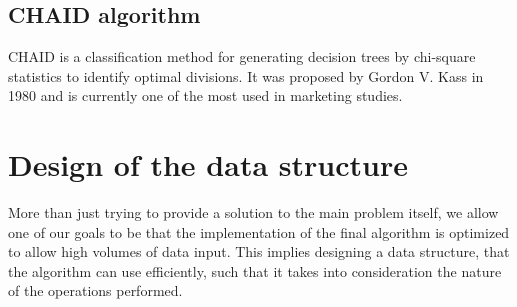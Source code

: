 \documentclass{acm_proc_article-sp}
\begin{document}
\subsection{CHAID algorithm}
CHAID is a classification method for generating decision trees by chi-square statistics to identify optimal divisions. It was proposed by Gordon V. Kass in 1980 and is currently one of the most used in marketing studies.

\section{Design of the data structure}
More than just trying to provide a solution to the main problem itself, we allow one of our goals to be that the implementation of the final algorithm is optimized to allow high volumes of data input. This implies designing a data structure, that the algorithm can use efficiently, such that it takes into consideration the nature of the operations performed.
\end{document}
